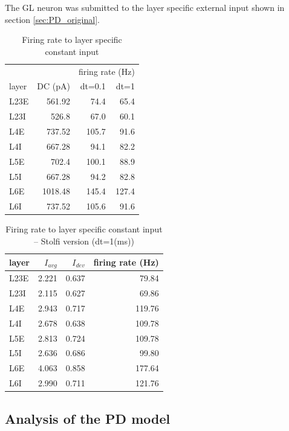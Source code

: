 \documentclass[11pt]{scrartcl}
\begin{document}
The GL neuron was submitted to the layer specific external input shown in section \ref{sec:PD_original}.

\begin{table}[h]
    \centering
    \caption{Firing rate to layer specific constant input}
    \label{tab:DC_input_firing_rate}
    \begin{tabular}{l|rrr}
        \multicolumn{2}{c}{}& \multicolumn{2}{c}{firing rate (Hz)} \\
        layer & DC (pA) & dt=0.1 & dt=1 \\
        \hline
        L23E & 561.92 & 74.4 & 65.4 \\
        L23I & 526.8 & 67.0 & 60.1 \\
        L4E & 737.52 & 105.7 & 91.6 \\
        L4I & 667.28 & 94.1 & 82.2 \\
        L5E & 702.4 & 100.1 & 88.9 \\
        L5I & 667.28 & 94.2 & 82.8 \\
        L6E & 1018.48 & 145.4 & 127.4 \\
        L6I & 737.52 & 105.6 & 91.6
    \end{tabular}
\end{table}

\begin{table}[h]
    \centering
    \caption{Firing rate to layer specific constant input -- Stolfi version (dt=1(ms))}
    \label{tab:DC_input_firing_rate_Stolfi}
    \begin{tabular}{l|rrr}
        layer & $I_{avg}$ & $I_{dev}$ & firing rate (Hz) \\
        \hline
        L23E & 2.221 & 0.637 & 79.84 \\
        L23I & 2.115 & 0.627 & 69.86 \\
        L4E & 2.943 & 0.717 & 119.76 \\
        L4I & 2.678 & 0.638 & 109.78 \\
        L5E & 2.813 & 0.724 & 109.78 \\
        L5I & 2.636 & 0.686 & 99.80 \\
        L6E & 4.063 & 0.858 & 177.64 \\
        L6I & 2.990 & 0.711 & 121.76
    \end{tabular}
\end{table}

\color{black}

\subsection{Analysis of the PD model}
\label{sec:orgedd205f}
\end{document}
